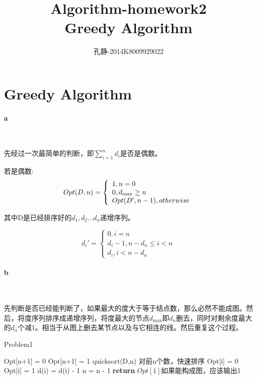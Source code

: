\documentclass{article}
\author{孔静-2014K8009929022}
\title{Algorithm-homework2\\Greedy Algorithm}
\begin{document}
	\maketitle 
	\tableofcontents
	\color{mypurple} \section{Greedy Algorithm}\color{black}
		\paragraph{a}\
		
			先经过一次最简单的判断，即$\sum\limits_{i = 1}^n {{d_i}}$是否是偶数。
			
			若是偶数:
			\[Opt(D,n) = \left\{ \begin{array}{l}
			1,{\rm{ }}n = 0\\
			0,{\rm{ }}{d_{\max }} \ge n\\
			Opt(D',n - 1),otherwise
			\end{array} \right.\]
			
			其中D是已经排序好的${d_1},{d_2}...{d_n}$递增序列。
			
			\[{d_i}' = \left\{ {\begin{array}{*{20}{l}}
				{0,i = n}\\
				{{d_i} - 1,n - {d_n} \le i < n}\\
				{{d_i},i < n - {d_n}}
				\end{array}} \right.\]
		
		\paragraph{b}\
		
			先判断是否已经能判断了，如果最大的度大于等于结点数，那么必然不能成图。然后，将度序列排序成递增序列，将度最大的节点${d_{\max }}$即${d_n}$删去，同时对剩余度最大的${d_n}$个减1。相当于从图上删去某节点以及与它相连的线。然后重复这个过程。
			\begin{algorithm}
				\caption{Problem1}
				\begin{algorithmic}
				\State Opt[n+1] = 0 
				\Else Opt[n+1] = 1 
				\EndIf
				\State quicksort(D,n)  \Comment 对前n个数，快速排序
				\State Opt[i] = 0
				\Else
				\State Opt[i] = 1
				\EndIf
				\State d(i) = d(i) - 1
				\EndFor
				\State n = n - 1
				\EndFor
				\State \textbf{return} $Opt[1]$\Comment 如果能构成图，应该输出1
				\EndProcedure
				\end{algorithmic}
			\end{algorithm}
		
\end{document}
